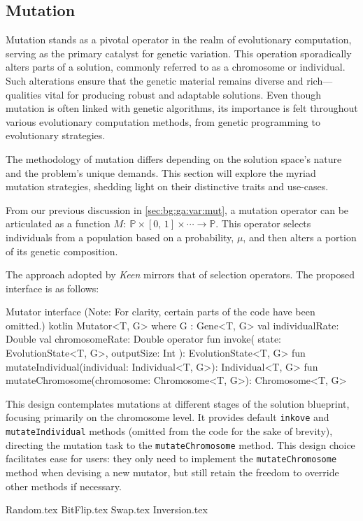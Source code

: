 \subsection{Mutation}
\label{sec:keen:op:mut}
  Mutation stands as a pivotal operator in the realm of evolutionary 
  computation, serving as the primary catalyst for genetic variation.
  This operation sporadically alters parts of a solution, commonly referred to 
  as a chromosome or individual. Such alterations ensure that the genetic 
  material remains diverse and rich—qualities vital for producing robust and 
  adaptable solutions. Even though mutation is often linked with genetic 
  algorithms, its importance is felt throughout various evolutionary 
  computation methods, from genetic programming to evolutionary strategies.

  The methodology of mutation differs depending on the solution space's nature 
  and the problem's unique demands. This section will explore the myriad 
  mutation strategies, shedding light on their distinctive traits and use-cases.

  From our previous discussion in \vref{sec:bg:ga:var:mut}, a mutation operator 
  can be articulated as a function \(M :\: \mathbb{P} \times [0,\, 1] \times 
  \cdots \to \mathbb{P}\). This operator selects individuals from a population 
  based on a probability, \(\mu\), and then alters a portion of its genetic 
  composition.

  The approach adopted by \textit{Keen} mirrors that of selection operators. 
  The proposed interface is as follows:

  \begin{code}{
    Mutator interface (Note: For clarity, certain parts of the code have been omitted.)
  }{}{kotlin}
    Mutator<T, G> where G : Gene<T, G> {
        val individualRate: Double
        val chromosomeRate: Double
        operator fun invoke(
            state: EvolutionState<T, G>, outputSize: Int
        ): EvolutionState<T, G>
        fun mutateIndividual(individual: Individual<T, G>): Individual<T, G>
        fun mutateChromosome(chromosome: Chromosome<T, G>): Chromosome<T, G>
    }
  \end{code}

  This design contemplates mutations at different stages of the solution 
  blueprint, focusing primarily on the chromosome level. It provides default
  \texttt{inkove} and \texttt{mutateIndividual} methods (omitted from the code 
  for the sake of brevity), directing the mutation task to the 
  \texttt{mutateChromosome} method. This design choice facilitates ease for
  users: they only need to implement the \texttt{mutateChromosome} method when
  devising a new mutator, but still retain the freedom to override other methods 
  if necessary.

  {Random.tex}
  {BitFlip.tex}
  {Swap.tex}
  {Inversion.tex}
